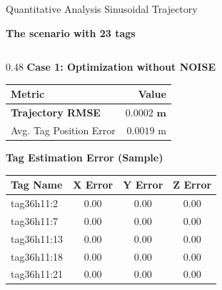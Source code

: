 \begin{frame}{Quantitative Analysis Sinusoidal Trajectory }
    \centering
    \footnotesize %

    \centering
    
    \textbf{The scenario with 23 tags}
    \vspace{0.5cm}

    \begin{columns}[T] %

        \begin{column}{0.48\textwidth}
            \centering
            \textbf{Case 1: Optimization without NOISE} 
            \vspace{0.1cm}

            \begin{tabular}{lr}
                \toprule
                \textbf{Metric} & \textbf{Value} \\
                \midrule
                \textbf{Trajectory RMSE} & $\mathbf{0.0002 \text{ m}}$ \\ 
                Avg. Tag Position Error & $0.0019 \text{ m}$ \\
                \bottomrule
            \end{tabular}

            \vspace{0.3cm}
            
            \textbf{Tag Estimation Error (Sample)}
            \begin{tabular}{lccc}
                \toprule
                \textbf{Tag Name} & $\mathbf{X}$ \textbf{Error} & $\mathbf{Y}$ \textbf{Error} & $\mathbf{Z}$ \textbf{Error} \\
                \midrule
                tag36h11:2 & $0.00$ & $0.00$ & $0.00$ \\
                tag36h11:7 & $0.00$ & $0.00$ & $0.00$ \\
                tag36h11:13 & $0.00$ & $0.00$ & $0.00$ \\
                tag36h11:18 & $0.00$ & $0.00$ & $0.00$ \\
                tag36h11:21 & $0.00$ & $0.00$ & $0.00$ \\
                \bottomrule
            \end{tabular}
        \end{column}


\end{columns}
\end{frame}
